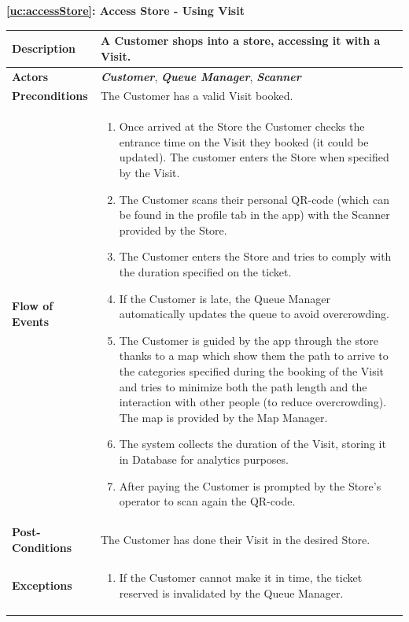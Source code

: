 \documentclass[a4paper, 12pt, oneside]{article}
\begin{document}
\begin{center}
{\textbf{\ref{uc:accessStore}: Access Store - Using Visit}}
\end{center}
\begin{tabularx}{\linewidth}{| l | X |}
	
	\hline
	\textbf{Description} & A Customer shops into a store, accessing it with a Visit.\\
	

	\hline
	\textbf{Actors} & \textbf{\textit{Customer}}, \textit{\textbf{Queue Manager}}, \textit{\textbf{Scanner}}  \\
	
	\hline
	\textbf{Preconditions} & The Customer has a valid Visit booked.\\
	
	\hline
	\textbf{Flow of Events} & \parbox{0.7\textwidth}{	
		\begin{enumerate}
			\item Once arrived at the Store the Customer checks the entrance time on the Visit they booked (it could be updated). The customer enters the Store when specified by the Visit.
			\item The Customer scans their personal QR-code (which can be found in the profile tab in the app) with the Scanner provided by the Store.
			\item The Customer enters the Store and tries to comply with the duration specified on the ticket.
			\item If the Customer is late, the Queue Manager automatically updates the queue to avoid overcrowding.
			\item The Customer is guided by the app through the store thanks to a map which show them the path to arrive to the categories specified during the booking of the Visit and tries to minimize both the path length and the interaction with other people (to reduce overcrowding). The map is provided by the Map Manager.
			\item The system collects the duration of the Visit, storing it in Database for analytics purposes.
			\item After paying the Customer is prompted by the Store's operator to scan again the QR-code.
	\end{enumerate}}\\
	
	\hline
	\textbf{Post-Conditions} & The Customer has done their Visit in the desired Store.\\
	
	\hline
	\textbf{Exceptions} & \parbox{0.7\textwidth}{ \begin{enumerate}
			\item If the Customer cannot make it in time, the ticket reserved is invalidated by the Queue Manager.
		\end{enumerate}}\\

	\hline
\end{tabularx}
\end{document}
